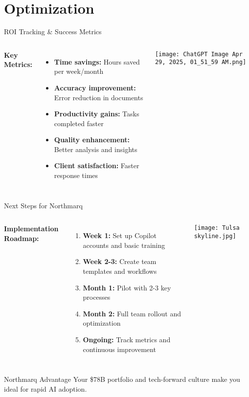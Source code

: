 \documentclass{beamer}
\begin{document}
\section{Optimization}

\begin{frame}{ROI Tracking \& Success Metrics}
  \begin{columns}
      \textbf{Key Metrics:}
      \begin{itemize}
        \item \textbf{Time savings:} Hours saved per week/month
        \item \textbf{Accuracy improvement:} Error reduction in documents
        \item \textbf{Productivity gains:} Tasks completed faster
        \item \textbf{Quality enhancement:} Better analysis and insights
        \item \textbf{Client satisfaction:} Faster response times
      \end{itemize}
      \centering
      \texttt{[image: ChatGPT Image Apr 29, 2025, 01\_51\_59 AM.png]}
  \end{columns}
\end{frame}



\begin{frame}{Next Steps for Northmarq}
  \begin{columns}
      \textbf{Implementation Roadmap:}
      \begin{enumerate}
        \item \textbf{Week 1:} Set up Copilot accounts and basic training
        \item \textbf{Week 2-3:} Create team templates and workflows
        \item \textbf{Month 1:} Pilot with 2-3 key processes
        \item \textbf{Month 2:} Full team rollout and optimization
        \item \textbf{Ongoing:} Track metrics and continuous improvement
      \end{enumerate}
      \centering
      \texttt{[image: Tulsa skyline.jpg]}
  \end{columns}

  \begin{block}{Northmarq Advantage}
    Your \$78B portfolio and tech-forward culture make you ideal for rapid AI adoption.
  \end{block}
\end{frame}
\end{document}
